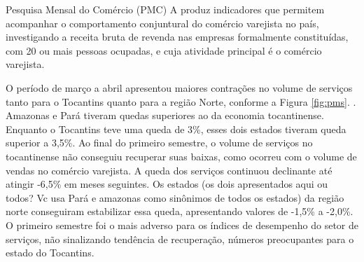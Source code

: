 \begin{smbox}[label={labelbox},nameref={Pesquisa Mensal do Comércio(PMC)}]{Pesquisa Mensal do Comércio (PMC)}
A  produz indicadores que permitem acompanhar o comportamento conjuntural do comércio varejista no país, investigando a receita bruta de revenda nas empresas formalmente constituídas, com 20 ou mais pessoas ocupadas, e cuja atividade principal é o comércio varejista.
\end{smbox}

\par O período de março a abril apresentou maiores contrações no volume de serviços tanto para o Tocantins quanto para a região Norte, conforme a Figura \ref{fig:pms}.  . Amazonas e Pará tiveram quedas superiores ao da economia tocantinense. Enquanto o Tocantins teve uma queda de 3\%, esses dois estados tiveram queda superior a 3,5\%. Ao final do primeiro semestre, o volume de serviços no tocantinense não conseguiu recuperar suas baixas, como ocorreu com o volume de vendas no comércio varejista. A queda dos serviços continuou declinante até atingir -6,5\% em meses seguintes. {\color{red}Os estados (os dois apresentados aqui ou todos? Vc usa Pará e amazonas como sinônimos de todos os estados)} da região norte conseguiram estabilizar essa queda, apresentando valores de -1,5\% a -2,0\%. O primeiro semestre foi o mais adverso para os índices de desempenho do setor de serviços, não sinalizando tendência de recuperação, números preocupantes para o estado do Tocantins.

